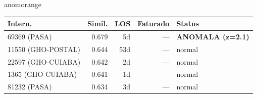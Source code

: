 \documentclass[a4paper,10pt]{article}
\begin{document}
\begin{anomalycard}[Internacao 165688 | GHO-PETROBRAS | ALTO (z=3.49)]{anomorange}
\begin{tabular}{l r r r l}\toprule\textbf{Intern.} & \textbf{Simil.} & \textbf{LOS} & \textbf{Faturado} & \textbf{Status} \\\midrule
69369 (PASA) & 0.679 & 5d & --- & \textcolor{anomred}{\textbf{ANOMALA (z=2.1)}} \\
11550 (GHO-POSTAL) & 0.644 & 53d & --- & \textcolor{jcubeblue}{normal} \\
22597 (GHO-CUIABA) & 0.642 & 2d & --- & \textcolor{jcubeblue}{normal} \\
1365 (GHO-CUIABA) & 0.641 & 1d & --- & \textcolor{jcubeblue}{normal} \\
81232 (PASA) & 0.634 & 3d & --- & \textcolor{jcubeblue}{normal} \\
\bottomrule\end{tabular}



\end{anomalycard}

\newpage
\end{document}
